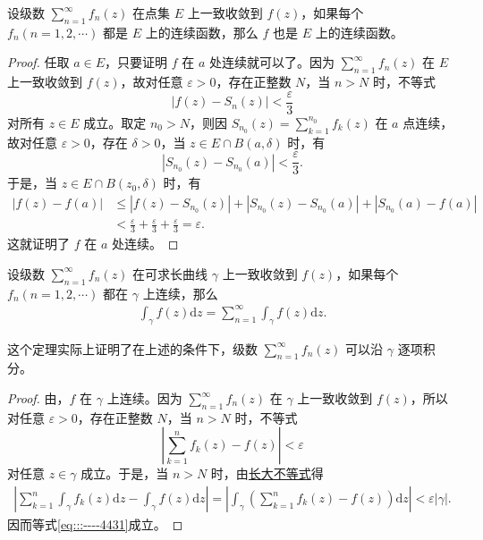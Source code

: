 \documentclass[../../main.tex]{subfiles}
\begin{document}
\begin{theorem}\label{theorem:定理4.1.4}
设级数 \( \sum_{n=1}^{\infty} f_n(z) \) 在点集 \( E \) 上一致收敛到 \( f(z) \)，如果每个 \( f_n (n = 1, 2, \cdots) \) 都是 \( E \) 上的连续函数，那么 \( f \) 也是 \( E \) 上的连续函数。
\end{theorem}
\begin{proof}
任取 \( a \in E \)，只要证明 \( f \) 在 \( a \) 处连续就可以了。因为 \( \sum_{n=1}^{\infty} f_n(z) \) 在 \( E \) 上一致收敛到 \( f(z) \)，故对任意 \( \varepsilon > 0 \)，存在正整数 \( N \)，当 \( n > N \) 时，不等式
\[
|f(z) - S_n(z)| < \frac{\varepsilon}{3}
\]
对所有 \( z \in E \) 成立。取定 \( n_0 > N \)，则因 \( S_{n_0}(z) = \sum_{k=1}^{n_0} f_k(z) \) 在 \( a \) 点连续，故对任意 \( \varepsilon > 0 \)，存在 \( \delta > 0 \)，当 \( z \in E \cap B(a, \delta) \) 时，有
\[
|S_{n_0}(z) - S_{n_0}(a)| < \frac{\varepsilon}{3}.
\]
于是，当 \( z \in E \cap B(z_0, \delta) \) 时，有
\begin{align*}
|f(z) - f(a)| &\leqslant |f(z) - S_{n_0}(z)| + |S_{n_0}(z) - S_{n_0}(a)| + |S_{n_0}(a) - f(a)| \\
&< \frac{\varepsilon}{3} + \frac{\varepsilon}{3} + \frac{\varepsilon}{3}= \varepsilon.
\end{align*}
这就证明了 \( f \) 在 \( a \) 处连续。
\end{proof}

\begin{theorem}\label{theorem:定理4.1.5}
设级数 \( \sum_{n=1}^{\infty} f_n(z) \) 在可求长曲线 \( \gamma \) 上一致收敛到 \( f(z) \)，如果每个 \( f_n (n = 1, 2, \cdots) \) 都在 \( \gamma \) 上连续，那么
\begin{align}
\int_{\gamma} f(z) \mathrm{d}z = \sum_{n=1}^{\infty} \int_{\gamma} f(z) \mathrm{d}z.\label{eq:::----4431}
\end{align}
\end{theorem}
\begin{remark}
这个定理实际上证明了在上述的条件下，级数 \( \sum_{n=1}^{\infty} f_n(z) \) 可以沿 \( \gamma \) 逐项积分。
\end{remark}
\begin{proof}
由，\( f \) 在 \( \gamma \) 上连续。因为 \( \sum_{n=1}^{\infty} f_n(z) \) 在 \( \gamma \) 上一致收敛到 \( f(z) \)，所以对任意 \( \varepsilon > 0 \)，存在正整数 \( N \)，当 \( n > N \) 时，不等式
\[
\left| \sum_{k=1}^{n} f_k(z) - f(z) \right| < \varepsilon
\]
对任意 \( z \in \gamma \) 成立。于是，当 \( n > N \) 时，由\hyperref[proposition:长大不等式]{长大不等式}得
\begin{align*}
\left| \sum_{k=1}^{n} \int_{\gamma} f_k(z) \mathrm{d}z - \int_{\gamma} f(z) \mathrm{d}z \right| = \left| \int_{\gamma} \left( \sum_{k=1}^{n} f_k(z) - f(z) \right) \mathrm{d}z \right| < \varepsilon |\gamma|.
\end{align*}
因而等式\eqref{eq:::----4431}成立。
\end{proof}
\end{document}
